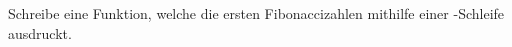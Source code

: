 \begin{aufg}
Schreibe eine Funktion, welche die ersten  Fibonaccizahlen mithilfe einer -Schleife ausdruckt.
\end{aufg}
